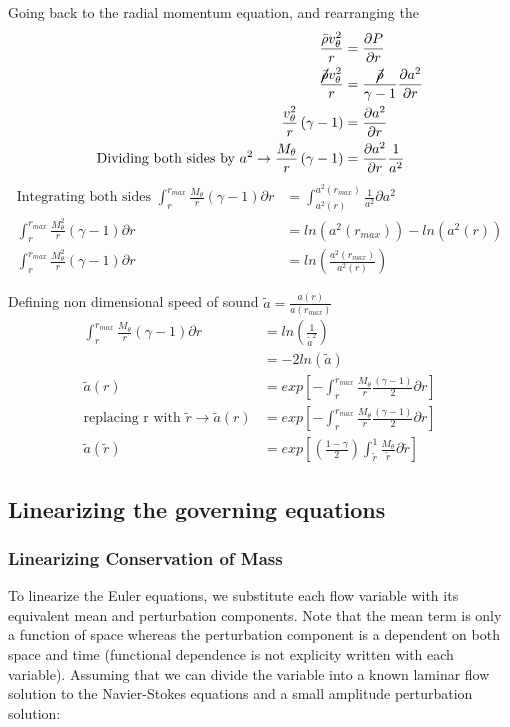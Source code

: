 \documentclass[12pt]{article}
\begin{document}
Going back to the radial momentum equation, and rearranging the 
\begin{align*}
\frac{\bar{\rho} v_{\theta}^2}{r} 
&=\frac{\partial P}{\partial r}\\
\frac{\cancel{\bar{\rho}} v_{\theta}^2}{r} 
&=\frac{\cancel{\bar{\rho}}}{\gamma -1}\frac{\partial a^2}{\partial r}\\
\frac{v_{\theta}^2}{r}\left(\gamma -1\right) &= \frac{\partial a^2}{\partial r}\\ \text{Dividing both sides by } a^2 \rightarrow \frac{M_{\theta}}{r}\left(\gamma - 1\right) &= \frac{\partial a^2}{\partial r} \frac{1}{a^2}
\end{align*}
\begin{align*}
\text{Integrating both sides } \int_{r}^{r_{max}}\frac{M_{\theta}}{r}\left(\gamma - 1\right){\partial r}  &=\int_{a^2(r)}^{a^2(r_{max})}\frac{1}{a^2}  {\partial a^2}\\
\int_{r}^{r_{max}}\frac{M^2_{\theta}}{r}\left(\gamma - 1\right){\partial r}  &=ln(a^2(r_{max})) - ln(a^2(r)) \\
\int_{r}^{r_{max}}\frac{M^2_{\theta}}{r}\left(\gamma - 1\right){\partial r}  &=ln\left(\frac{a^2(r_{max})}{a^2(r)}\right) 
\end{align*}

Defining non dimensional speed of sound $\tilde{a} = \frac{a(r)}{a(r_{max})}$
\begin{align*}
\int_{r}^{r_{max}}\frac{M_{\theta}}{r}\left(\gamma - 1\right){\partial r}  &=ln\left(\frac{1}{\tilde{a}^2}\right) \\
&= -2ln(\tilde{a})\\
\tilde{a}(r) &= exp\left[-\int_{r}^{r_{max}}\frac{M_{\theta}}{r}\frac{\left(\gamma - 1\right)}{2}{\partial r}\right] \\ \text{replacing r with }\tilde{r} \rightarrow \tilde{a}(r) &= exp\left[-\int_{r}^{r_{max}}\frac{M_{\theta}}{r}\frac{\left(\gamma - 1\right)}{2}{\partial r}\right]		\\
\tilde{a}(\tilde{r}) &= exp\left[\left(\frac{1 - \gamma}{2}\right)\int_{\tilde{r}}^{1}\frac{M_{\theta}}{\tilde{r}}{\partial \tilde{r}}\right]	
\end{align*}
\subsection{Linearizing the governing equations}
\subsubsection{Linearizing Conservation of Mass}
To linearize the Euler equations, we substitute each flow variable with its equivalent mean and perturbation components. Note that the mean term is only a function of space whereas the perturbation component is a dependent on both space and time (functional dependence is not explicity written with each variable). Assuming that we can divide the variable into a known laminar flow solution to the Navier-Stokes equations and a small amplitude perturbation solution:
\end{document}
